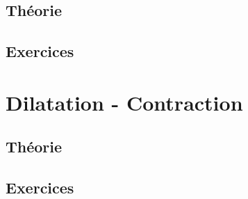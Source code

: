 \documentclass{report}
\begin{document}
\section{Théorie}



\section{Exercices}



\chapter{Dilatation - Contraction}
\section{Théorie}



\section{Exercices}

\end{document}
